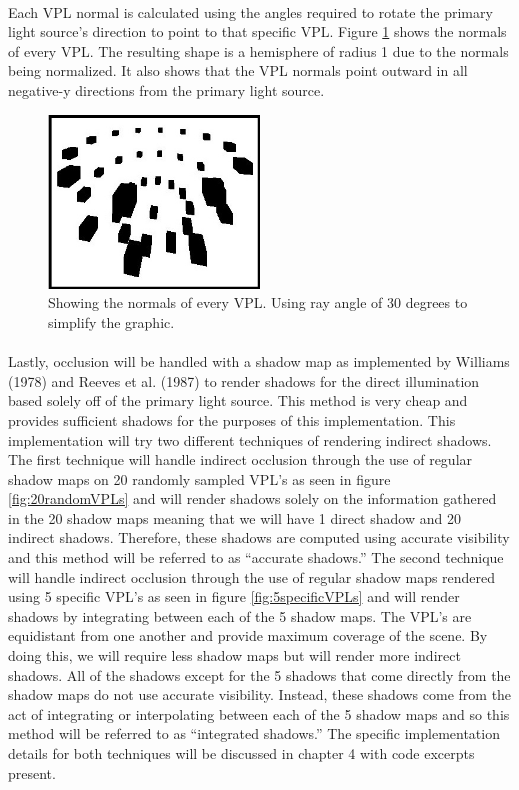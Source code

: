 \paragraph{}
Each VPL normal is calculated using the angles required to rotate the primary light source's direction to point to that specific VPL.  Figure \ref{fig:vplNormals} shows the normals of every VPL.  The resulting shape is a hemisphere of radius 1 due to the normals being normalized.  It also shows that the VPL normals point outward in all negative-y directions from the primary light source.

\begin{figure}[h!]
  \centering
    \includegraphics[width=0.5\textwidth]{vplNormals.jpg}
  	\caption{Showing the normals of every VPL. Using ray angle of 30 degrees to simplify the graphic.}
	\label{fig:vplNormals}
\end{figure}

\paragraph{}
Lastly, occlusion will be handled with a shadow map as implemented by Williams (1978) and Reeves et al. (1987) to render shadows for the direct illumination based solely off of the primary light source.  This method is very cheap and provides sufficient shadows for the purposes of this implementation.  This implementation will try two different techniques of rendering indirect shadows.  The first technique will handle indirect occlusion through the use of regular shadow maps on 20 randomly sampled VPL's as seen in figure \ref{fig:20randomVPLs} and will render shadows solely on the information gathered in the 20 shadow maps meaning that we will have 1 direct shadow and 20 indirect shadows.  Therefore, these shadows are computed using accurate visibility and this method will be referred to as ``accurate shadows.''  The second technique will handle indirect occlusion through the use of regular shadow maps rendered using 5 specific VPL's as seen in figure \ref{fig:5specificVPLs} and will render shadows by integrating between each of the 5 shadow maps.  The VPL's are equidistant from one another and provide maximum coverage of the scene.  By doing this, we will require less shadow maps but will render more indirect shadows.  All of the shadows except for the 5 shadows that come directly from the shadow maps do not use accurate visibility.  Instead, these shadows come from the act of integrating or interpolating between each of the 5 shadow maps and so this method will be referred to as ``integrated shadows.''  The specific implementation details for both techniques will be discussed in chapter 4 with code excerpts present.

